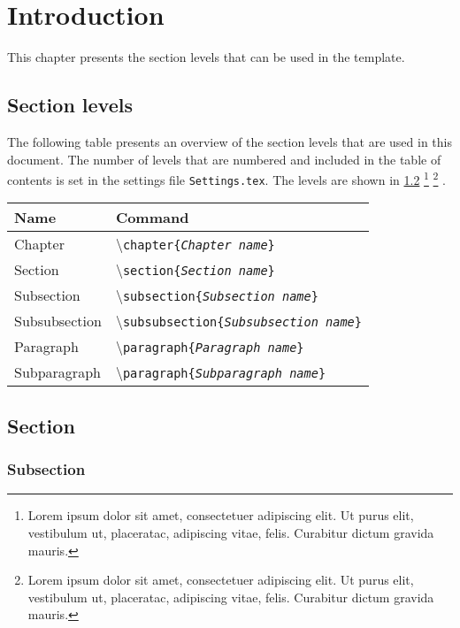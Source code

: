 \chapter{Introduction}
This chapter presents the section levels that can be used in the template.

\section{Section levels}
The following table presents an overview of the section levels that are used in this document. The number of levels that are numbered and included in the table of contents is set in the settings file \texttt{Settings.tex}. The levels are shown in \cref{sec:introduction_section}%
\footnote{
Lorem ipsum dolor sit amet, consectetuer adipiscing elit. Ut purus elit, vestibulum ut, placeratac, adipiscing vitae, felis. Curabitur dictum gravida mauris.}%
\footnotemarksep%
\footnote{Lorem ipsum dolor sit amet, consectetuer adipiscing elit. Ut purus elit, vestibulum ut, placeratac, adipiscing vitae, felis. Curabitur dictum gravida mauris.}%
.

\begin{table}[H]
    \centering
    \begin{tabular}{ll}
    \toprule
    Name & Command\\ \midrule
    Chapter & \textbackslash\texttt{chapter\{\emph{Chapter name}\}}\\
    Section & \textbackslash\texttt{section\{\emph{Section name}\}}\\
    Subsection & \textbackslash\texttt{subsection\{\emph{Subsection name}\}}\\
    Subsubsection & \textbackslash\texttt{subsubsection\{\emph{Subsubsection name}\}}\\
    Paragraph & \textbackslash\texttt{paragraph\{\emph{Paragraph name}\}}\\
    Subparagraph & \textbackslash\texttt{paragraph\{\emph{Subparagraph name}\}}\\
    \bottomrule
    \end{tabular}
\end{table}


\section{Section} \label{sec:introduction_section}
\subsection{Subsection}
